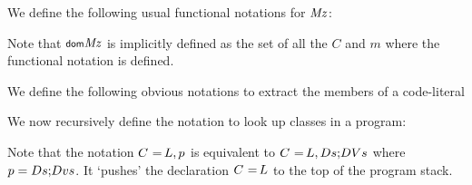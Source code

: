 
We define the following usual functional notations for  $\mathit{Mz}$:

\begin{defs}
\end{defs}
Note that $\dom{\Mz}$ is implicitly defined as the set of all the $C$ and $m$ where the functional notation is defined.

We define the following obvious notations to extract the members of a code-literal

\begin{defs}


\end{defs}

We now recursively define the notation to look up classes in a program:

\begin{defs}
\end{defs}

Note that the notation $\tld{C}{L}, p$ is equivalent to $\prog{\tld{C}{L},Ds}{DVs}$ where $p = \prog{Ds}{Dvs}$. It `pushes' the declaration $\tld{C}{L}$ to the top of the program stack.

